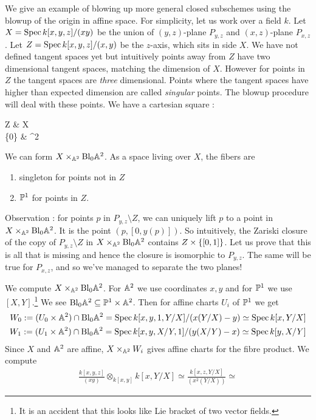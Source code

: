\documentclass[./main.tex]{subfiles}
\begin{document}
\begin{eg}
  We give an example of blowing up more general closed subschemes
  using the blowup of the origin in affine space.
  For simplicity, let us work over a field $k$.
  Let $X = \operatorname{Spec} k[x , y , z] / (x y)$ be the union of
  $(y , z)$-plane $P_{y,z}$ and $(x , z)$-plane $P_{x,z}$.
  Let $Z = \operatorname{Spec} k[x , y , z] / (x , y)$ be the $z$-axis,
  which sits in side $X$.
  We have not defined tangent spaces yet but
  intuitively points away from $Z$ have two dimensional tangent spaces,
  matching the dimension of $X$.
  However for points in $Z$ the tangent spaces are \emph{three} dimensional.
  Points where the tangent spaces have higher than expected dimension
  are called \emph{singular} points.
  The blowup procedure will deal with these points.
  We have a cartesian square :
  \begin{cd}
    Z & X \\
    {\{0\}} & {^{2}}
    \arrow[from=1-1, to=1-2]
    \arrow[from=1-1, to=2-1]
    \arrow["\lrcorner"{anchor=center, pos=0.125}, draw=none, from=1-1, to=2-2]
    \arrow["{(x,y)}", from=1-2, to=2-2]
    \arrow[from=2-1, to=2-2]
  \end{cd}
  We can form $X \times_{\mathbb{A}^2} \mathrm{Bl}_0 \mathbb{A}^2$.
  As a space living over $X$,
  the fibers are 
  \begin{enumerate}
    \item singleton for points not in $Z$
    \item $\mathbb{P}^1$ for points in $Z$.
  \end{enumerate}
  Observation : 
  for points $p$ in $P_{y,z} \setminus Z$,
  we can uniquely lift $p$ to a point in
  $X \times_{\mathbb{A}^2} \mathrm{Bl}_0 \mathbb{A}^2$.
  It is the point $(p , [0 , y(p)])$.
  So intuitively,
  the Zariski closure of the copy of $P_{y , z} \setminus Z$ in
  $X \times_{\mathbb{A}^2} \mathrm{Bl}_0 \mathbb{A}^2$ contains
  $Z \times \left\{[0 , 1]\right\}$.
  Let us prove that this is all that is missing
  and hence the closure is isomorphic to $P_{y , z}$.
  The same will be true for $P_{x , z}$,
  and so we've managed to separate the two planes!

  We compute $X \times_{\mathbb{A}^2} \mathrm{Bl}_0 \mathbb{A}^2$.
  For $\mathbb{A}^2$ we use coordinates $x , y$
  and for $\mathbb{P}^1$ we use $[X , Y]$.\footnote{
    It is an accident that this looks like Lie bracket of two vector fields.
  }
  We see $\mathrm{Bl}_0 \mathbb{A}^2 \subseteq \mathbb{P}^1 \times \mathbb{A}^2$.
  Then for affine charts $U_i$ of $\mathbb{P}^1$ we get
  \begin{align*}
    W_0 := (U_0 \times \mathbb{A}^2) \cap \mathrm{Bl}_0 \mathbb{A}^2
    = \operatorname{Spec} k[x , y , 1 , Y / X] / (x (Y / X) - y) 
    \simeq \operatorname{Spec} k[x , Y / X] \\
    W_1 := (U_1 \times \mathbb{A}^2) \cap \mathrm{Bl}_0 \mathbb{A}^2
    = \operatorname{Spec} k[x , y , X / Y , 1] / (y (X / Y) - x) 
    \simeq \operatorname{Spec} k[y , X / Y]
  \end{align*}
  Since $X$ and $\mathbb{A}^2$ are affine,
  $X \times_{\mathbb{A}^2} W_i$ gives affine charts for the fibre product.
  We compute \begin{align*}
    \frac{k[x , y , z]}{(x y)} 
      \otimes_{k[x , y]} {k[x , Y / X]}
    \simeq \frac{k[x , z , Y / X]}{(x^2(Y / X))}
    \simeq 
  \end{align*}
  

\end{eg}
\end{document}
